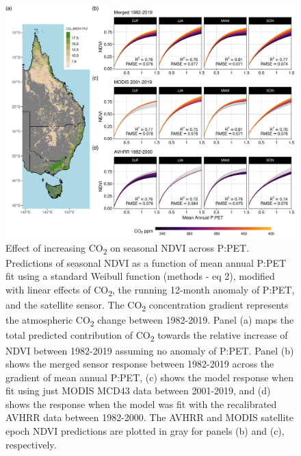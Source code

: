 \documentclass[gc, manuscript]{copernicus}
\begin{document}
\begin{figure}
\includegraphics[width=14cm]{../../figures/Fig5_n4_ndvi_map_weibull_ppet_x_co2_modeled_effect} \caption{Effect of increasing CO\textsubscript{2} on seasonal NDVI across P:PET. Predictions of seasonal NDVI as a function of mean annual P:PET fit using a standard Weibull function (methods - eq 2), modified with linear effects of CO\textsubscript{2}, the running 12-month anomaly of P:PET, and the satellite sensor. The CO\textsubscript{2} concentration gradient represents the atmospheric CO\textsubscript{2} change between 1982-2019. Panel (a) maps the total predicted contribution of CO\textsubscript{2} towards the relative increase of NDVI between 1982-2019 assuming no anomaly of P:PET. Panel (b) shows the merged sensor response between 1982-2019 across the gradient of mean annual P:PET, (c) shows the model response when fit using just MODIS MCD43 data between 2001-2019, and (d) shows the response when the model was fit with the recalibrated AVHRR data between 1982-2000. The AVHRR and MODIS satellite epoch NDVI predictions are plotted in gray for panels (b) and (c), respectively.}\label{fig:unnamed-chunk-4}
\end{figure}
\clearpage
\end{document}
